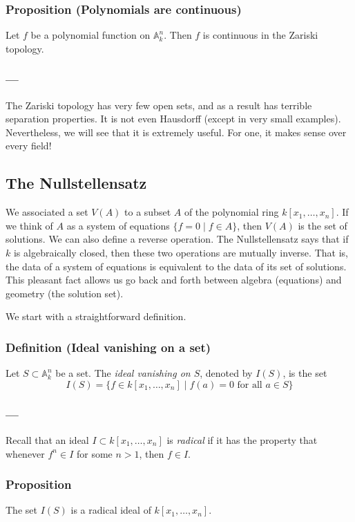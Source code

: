 \documentclass[11pt]{article}
\begin{document}
\subsubsection{Proposition (Polynomials are continuous)}
\label{sec:orga0e2598}
Let \(f\) be a polynomial function on \(\mathbb A^n_k\).
Then \(f\) is continuous in the Zariski topology.

\subsubsection{---}
\label{sec:orgeb81226}
The Zariski topology has very few open sets, and as a result has terrible separation properties.
It is not even Hausdorff (except in very small examples).
Nevertheless, we will see that it is extremely useful.
For one, it makes sense over every field!

\subsection{The Nullstellensatz}
\label{sec:org9124986}
We associated a set \(V(A)\) to a subset \(A\) of the polynomial ring \(k[x_1,\dots,x_n]\).
If we think of \(A\) as a system of equations \(\{f = 0 \mid f \in A\}\), then \(V(A)\) is the set of solutions.
We can also define a reverse operation.
The Nullstellensatz says that if \(k\) is algebraically closed, then these two operations are mutually inverse.
That is, the data of a system of equations is equivalent to the data of its set of solutions.
This pleasant fact allows us go back and forth between algebra (equations) and geometry (the solution set).

We start with a straightforward definition.
\subsubsection{Definition (Ideal vanishing on a set)}
\label{sec:org9411f7f}
Let \(S \subset \mathbb A^n_k\) be a set.
The \emph{ideal vanishing on \(S\)}, denoted by \(I(S)\), is the set
\[ I(S) = \{f \in k[x_1,\dots,x_n] \mid f(a) = 0 \text{ for all } a \in S\}\]

\subsubsection{---}
\label{sec:orgbb3e2c9}
Recall that an ideal \(I \subset k[x_1,\dots,x_n]\) is \emph{radical} if it has the property that whenever \(f^n \in I\) for some \(n > 1\), then \(f \in I\).
\subsubsection{Proposition}
\label{sec:orgda22fb1}
The set \(I(S)\) is a radical ideal of \(k[x_1,\dots,x_n]\).
\end{document}
